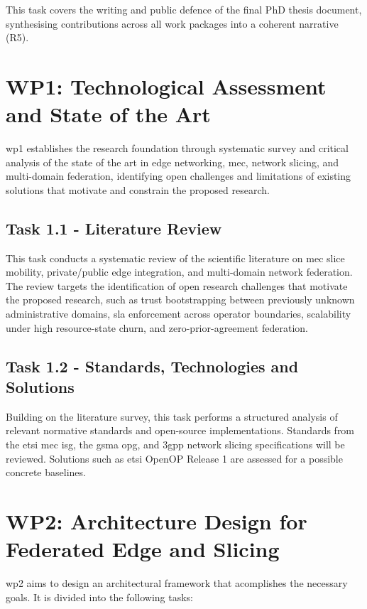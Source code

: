 This task covers the writing and public defence of the final PhD thesis document, synthesising contributions across all work packages into a coherent narrative (R5).

\section{WP1: Technological Assessment and State of the Art}

\ac{wp}1 establishes the research foundation through systematic survey and critical analysis of the state of the art in edge networking, \ac{mec}, network slicing, and multi-domain federation, identifying open challenges and limitations of existing solutions that motivate and constrain the proposed research.

\subsection{Task 1.1 - Literature Review}

This task conducts a systematic review of the scientific literature on \ac{mec} slice mobility, private/public edge integration, and multi-domain network federation. The review targets the identification of open research challenges that motivate the proposed research, such as trust bootstrapping between previously unknown administrative domains, \ac{sla} enforcement across operator boundaries, scalability under high resource-state churn, and zero-prior-agreement federation.

\subsection{Task 1.2 - Standards, Technologies and Solutions}

Building on the literature survey, this task performs a structured analysis of relevant normative standards and open-source implementations. Standards from the \ac{etsi} \ac{mec} \ac{isg}, the \ac{gsma} \ac{opg}, and \ac{3gpp} network slicing specifications will be reviewed. Solutions such as \ac{etsi} OpenOP Release 1 are assessed for a possible concrete baselines.

\section{WP2: Architecture Design for Federated Edge and Slicing}

\ac{wp}2 aims to design an architectural framework that acomplishes the necessary goals. It is divided into the following tasks:

